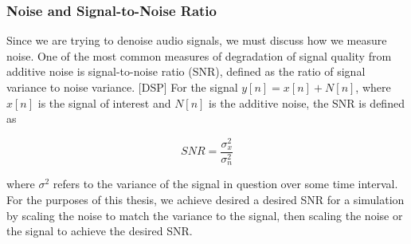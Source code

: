 \subsubsection{Noise and Signal-to-Noise Ratio}
Since we are trying to denoise audio signals, we must discuss how we measure noise. One of the most common measures of degradation of signal quality from additive noise is signal-to-noise ratio (SNR), defined as the ratio of signal variance to noise variance. [DSP] For the signal $y[n] = x[n] + N[n]$, where $x[n]$ is the signal of interest and $N[n]$ is the additive noise, the SNR is defined as

\begin{equation}
SNR = \dfrac{\sigma_{x}^2}{\sigma_{n}^2}
\end{equation}

where $\sigma^{2}$ refers to the variance of the signal in question over some time interval. For the purposes of this thesis, we achieve desired a desired SNR for a simulation by scaling the noise to match the variance to the signal, then scaling the noise or the signal to achieve the desired SNR. %

